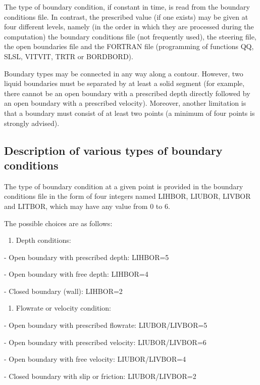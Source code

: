  The type of boundary condition, if constant in time, is read from the boundary conditions file. In contrast, the prescribed value (if one exists) may be given at four different levels, namely (in the order in which they are processed during the computation) the boundary conditions file (not frequently used), the steering file, the open boundaries file and the FORTRAN file (programming of functions QQ, SLSL, VITVIT, TRTR or BORDBORD).

 Boundary types may be connected in any way along a contour. However, two liquid boundaries must be separated by at least a solid segment (for example, there cannot be an open boundary with a prescribed depth directly followed by an open boundary with a prescribed velocity). Moreover, another limitation is that a boundary must consist of at least two points (a minimum of four points is strongly advised).


\subsection{ Description of various types of boundary conditions}

 The type of boundary condition at a given point is provided in the boundary conditions file in the form of four integers named LIHBOR, LIUBOR, LIVBOR and LITBOR, which may have any value from 0 to 6.

 The possible choices are as follows:

\begin{enumerate}
\item  Depth conditions:
\end{enumerate}

 - Open boundary with prescribed depth: LIHBOR=5

 - Open boundary with free depth: LIHBOR=4

 - Closed boundary (wall): LIHBOR=2

\begin{enumerate}
\item  Flowrate or velocity condition:
\end{enumerate}

 - Open boundary with prescribed flowrate: LIUBOR/LIVBOR=5

 - Open boundary with prescribed velocity: LIUBOR/LIVBOR=6

 - Open boundary with free velocity: LIUBOR/LIVBOR=4

 - Closed boundary with slip or friction: LIUBOR/LIVBOR=2

